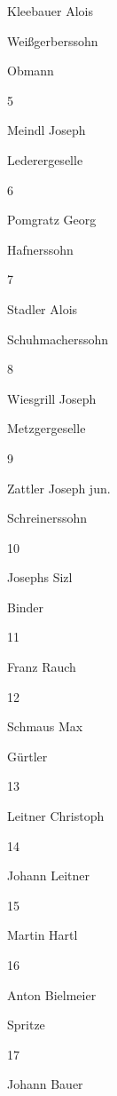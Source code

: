 \documentclass[12pt,a4pager]{book}
\begin{document}
Kleebauer Alois

Weißgerberssohn

Obmann

5

Meindl Joseph

Lederergeselle



6

Pomgratz Georg

Hafnerssohn



7

Stadler Alois

Schuhmacherssohn



8

Wiesgrill Joseph

Metzgergeselle



9

Zattler Joseph jun.

Schreinerssohn



10

Josephs Sizl

Binder



11

Franz Rauch





12

Schmaus Max

Gürtler



13

Leitner Christoph





14

Johann Leitner





15

Martin Hartl





16

Anton Bielmeier



Spritze

17

Johann Bauer
\end{document}
